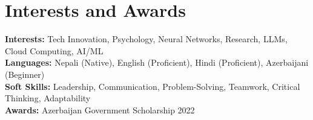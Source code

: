 \documentclass[letterpaper,11pt]{article}
\begin{document}
\section{Interests and Awards}
\begin{itemize}[leftmargin=0.15in, label={}]
   \small{\item{

   \textbf{Interests:} Tech Innovation, Psychology, Neural Networks, Research,  LLMs, Cloud Computing, AI/ML\\
    \textbf{Languages:} Nepali (Native), English (Proficient), Hindi (Proficient), Azerbaijani (Beginner)\\
    \textbf{Soft Skills:} Leadership, Communication, Problem-Solving, Teamwork, Critical Thinking, Adaptability\\
      \textbf{Awards:} Azerbaijan Government Scholarship 2022
}}
\end{itemize}
\end{document}
